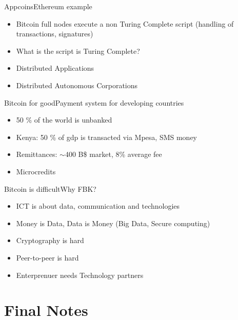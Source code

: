 \documentclass[english,compress]{beamer}
\begin{document}
\begin{frame}{Appcoins}{Ethereum example}
\begin{itemize}
 
 \item Bitcoin full nodes execute a non Turing Complete script (handling of transactions, signatures)
 \item What is the script is Turing Complete?
 \item Distributed Applications
 \item Distributed Autonomous Corporations
 \end{itemize}

 
\end{frame}

\begin{frame}{Bitcoin for good}{Payment system for developing countries}
\begin{itemize}
 \item 50 \% of the world is unbanked
 \item Kenya: 50 \% of gdp is transacted via Mpesa, SMS money
 \item Remittances: $\sim$400 B\$ market, 8\% average fee
 \item Microcredits
\end{itemize}
\end{frame}

\begin{frame}{Bitcoin is difficult}{Why FBK?}
\begin{itemize}
  \item ICT is about data, communication and technologies
  \item Money is Data, Data is Money (Big Data, Secure computing)
  \item Cryptography is hard
  \item Peer-to-peer is hard
  \item Enterprenuer needs Technology partners
 \end{itemize}
\end{frame}


\section{Final Notes}
\end{document}
